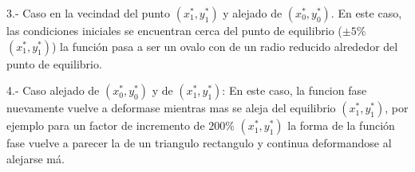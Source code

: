 \documentclass[letterpaper,11pt]{article}
\begin{document}
3.- Caso en la vecindad del punto $(x_{1}^{\ast },y_{1}^{\ast })$ y alejado
de $(x_{0}^{\ast },y_{0}^{\ast })$. En este caso, las condiciones iniciales
se encuentran cerca del punto de equilibrio ($\pm 5\%$ $(x_{1}^{\ast
},y_{1}^{\ast })$) la funci\'{o}n pasa a ser un ovalo con de un radio
reducido alrededor del punto de equilibrio.

4.- Caso alejado de $(x_{0}^{\ast },y_{0}^{\ast })$ y de $(x_{1}^{\ast
},y_{1}^{\ast })$: En este caso, la funcion fase nuevamente vuelve a
deformase mientras mas se aleja del equilibrio $(x_{1}^{\ast },y_{1}^{\ast
}) $, por ejemplo para un factor de incremento de $200\%$ $(x_{1}^{\ast
},y_{1}^{\ast })$ la forma de la funci\'{o}n fase vuelve a parecer la de un
triangulo rectangulo y continua deformandose al alejarse m\'{a}.
\end{document}
